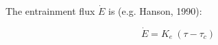 \documentclass[11pt]{article}
\begin{document}
%
%
% 
%
%
%
%
%
%
%
%

The entrainment flux $\dot{E}$ is (e.g. Hanson, 1990):

\begin{equation}
\dot{E} = K_e \: (\tau - {\tau_c})
\end{equation}
\end{document}
